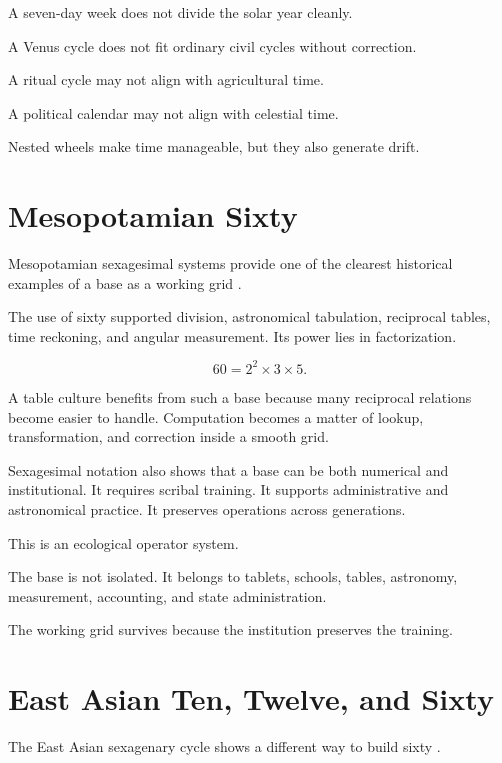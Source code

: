 \documentclass[11pt]{book}
\begin{document}
A seven-day week does not divide the solar year cleanly.

A Venus cycle does not fit ordinary civil cycles without correction.

A ritual cycle may not align with agricultural time.

A political calendar may not align with celestial time.

Nested wheels make time manageable, but they also generate drift.

\section{Mesopotamian Sixty}

Mesopotamian sexagesimal systems provide one of the clearest historical examples of a base as a working grid \cite{Neugebauer1957ExactSciences,Robson2008MathematicsAncientIraq,HungerPingree1999AstralSciences,Ossendrijver2016AncientBabylonianAstronomers}.

The use of sixty supported division, astronomical tabulation, reciprocal tables, time reckoning, and angular measurement. Its power lies in factorization.

\[
60 = 2^2 \times 3 \times 5.
\]

A table culture benefits from such a base because many reciprocal relations become easier to handle. Computation becomes a matter of lookup, transformation, and correction inside a smooth grid.

Sexagesimal notation also shows that a base can be both numerical and institutional. It requires scribal training. It supports administrative and astronomical practice. It preserves operations across generations.

This is an ecological operator system.

The base is not isolated. It belongs to tablets, schools, tables, astronomy, measurement, accounting, and state administration.

The working grid survives because the institution preserves the training.

\section{East Asian Ten, Twelve, and Sixty}

The East Asian sexagenary cycle shows a different way to build sixty \cite{Needham1959ScienceCivilisationChina3,Loewe1994DivinationMythologyMonarchy,Nylan2001FiveConfucianClassics}.
\end{document}
